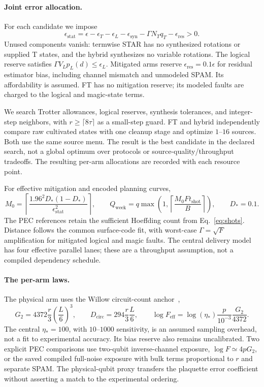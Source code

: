 \documentclass[11pt]{article}
\newcommand{\eps}{\epsilon}
\begin{document}
\paragraph{Joint error allocation.}
For each candidate we impose
\begin{equation}\label{eq:optimized-budget}
 \eps_{\mathrm{stat}}=\eps-\eps_T-\eps_L-\eps_{\mathrm{syn}}
       -\Gamma N_Tq_T-\eps_{\mathrm{res}}>0.
\end{equation}
Unused components vanish: termwise STAR has no synthesized rotations or
supplied T states, and the hybrid synthesizes no variable rotations.
The logical reserve satisfies $\Gamma V_Lp_L(d)\leq\eps_L$.
Mitigated arms reserve $\eps_{\mathrm{res}}=0.1\eps$ for residual estimator
bias, including channel mismatch and unmodeled SPAM. Its affordability is
assumed. FT has no mitigation reserve; its modeled faults are charged to the
logical and magic-state terms.

We search Trotter allowances, logical reserves, synthesis tolerances, and
integer-step neighbors, with $r\geq\lceil8\tau\rceil$ as a small-step guard.
FT and hybrid independently compare raw cultivated states with one cleanup
stage and optimize $1$--$16$ sources. Both use the same source menu.
The result is the best candidate in the declared search, not a global
optimum over protocols or source-quality/throughput tradeoffs.
The resulting per-arm allocations are recorded with each resource point.

For effective mitigation and encoded planning curves,
\begin{equation}
 M_0=\left\lceil\frac{1.96^2D_*(1-D_*)}{\eps_{\mathrm{stat}}^2}\right\rceil,
 \qquad Q_{\mathrm{week}}=q\max\left(1,
 \left\lceil\frac{M_0Ft_{\mathrm{shot}}}{B}\right\rceil\right),
 \qquad D_*=0.1.
\end{equation}
The PEC references retain the sufficient Hoeffding count from
Eq.~\eqref{eq:shots}. Distance follows the common surface-code fit, with
worst-case $\Gamma=\sqrt F$ amplification for mitigated logical and magic
faults. The central delivery model has four effective parallel lanes;
these are a throughput assumption, not a compiled dependency schedule.

\paragraph{The per-arm laws.}
The physical arm uses the Willow circuit-count anchor~\cite{phasecraftwillow2025},
\begin{equation}
 G_2=4372\frac r3\left(\frac L6\right)^3,\qquad
 D_{\mathrm{circ}}=294\frac r3\frac L6,\qquad
 \log F_{\mathrm{eff}}=\log(\eta_*)\frac p{10^{-3}}\frac{G_2}{4372}.
\end{equation}
The central $\eta_*=100$, with $10$--$1000$ sensitivity, is an assumed
sampling overhead, not a fit to experimental accuracy. Its bias reserve
also remains uncalibrated. Two explicit PEC comparisons use two-qubit
inverse-channel exposure, $\log F\simeq4pG_2$, or the saved compiled
full-noise exposure with bulk terms proportional to $r$ and separate SPAM.
The physical-qubit proxy transfers the plaquette error coefficient without asserting
a match to the experimental ordering.
\end{document}
